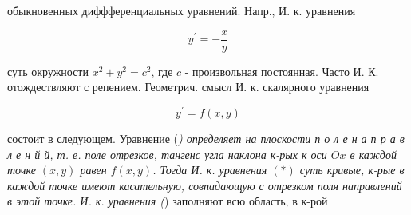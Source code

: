 \documentclass[10pt]{article}
\begin{document}
обыкновенных диффференциальных уравнений. Напр., И. к. уравнения



\[

y^{\prime}=-\frac{x}{y}

\]



суть окружности $x^{2}+y^{2}=c^{2}$, где $c$ - произвольная постоянная. Часто И. К. отождествляют с репением. Геометрич. смысл И. к. скалярного уравнения



\[

y^{\prime}=f(x, y)

\]



состоит в следующем. Уравнение (\textit{) определяет на плоскости п о л е н а п р а в л е н й й, т. е. поле отрезков, тангенс угла наклона к-рых к оси $O x$ в каждой точке $(x, y)$ равен $f(x, y)$. Тогда И. к. уравнения $(*)$ суть кривые, к-рые в каждой точке имеют касательную, совпадающую с отрезком поля направлений в этой точке. И. к. уравнения (}) заполняют всю область, в к-рой
\end{document}
